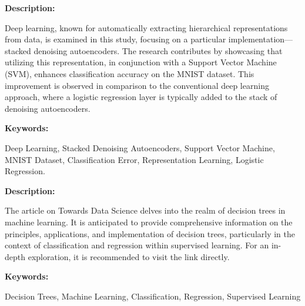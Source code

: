 { 
	
	\textbf{Description:}
	
	Deep learning, known for automatically extracting hierarchical representations from data, is examined in this study, focusing on a particular implementation—stacked denoising autoencoders. The research contributes by showcasing that utilizing this representation, in conjunction with a Support Vector Machine (SVM), enhances classification accuracy on the MNIST dataset. This improvement is observed in comparison to the conventional deep learning approach, where a logistic regression layer is typically added to the stack of denoising autoencoders.\autocite{Lauzon:2012}

	
	
	
	\textbf{Keywords:} 
	
	Deep Learning, Stacked Denoising Autoencoders, Support Vector Machine, MNIST Dataset, Classification Error, Representation Learning, Logistic Regression.
	
	
	
}






{ 
	
	\textbf{Description:}
	
	The article on Towards Data Science delves into the realm of decision trees in machine learning. It is anticipated to provide comprehensive information on the principles, applications, and implementation of decision trees, particularly in the context of classification and regression within supervised learning. For an in-depth exploration, it is recommended to visit the link directly.\autocite{Prashant:2017}


	
	\textbf{Keywords:} 
	
	Decision Trees, Machine Learning, Classification, Regression, Supervised Learning

	
	
	
}





